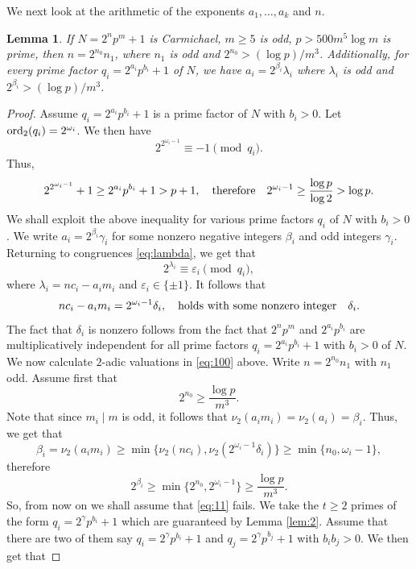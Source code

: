 \documentclass[11pt]{article}
\newtheorem{lemma}[lem]{Lemma}
\begin{document}
We next look at the arithmetic of the exponents $a_1,\ldots,a_k$ and $n$.

\begin{lemma}
\label{lem:12}
If $N=2^np^m+1$ is Carmichael, $m\ge 5$ is odd, $p>500m^5\log m$ is prime, then $n=2^{n_0}n_1$, where $n_1$ is odd and $2^{n_0}>(\log p)/m^3$. Additionally,  for every prime factor $q_i=2^{a_i}p^{b_i}+1$ of $N$, we have $a_i=2^{\beta_i}\lambda_i$ where $\lambda_i$ is odd and 
$2^{\beta_i}>(\log p)/m^3$. 
\end{lemma}


\begin{proof}
Assume $q_i=2^{a_i}p^{b_i}+1$ is a prime factor of $N$ with $b_i>0$. Let ${\text{\rm ord}}_2(q_i)=2^{\omega_i}$. We then have 
$$
2^{2^{\omega_i-1}}\equiv -1\pmod {q_i}.
$$
Thus, 
\begin{equation}
\label{e:10}
2^{2^{\omega_i-1}}+1\ge 2^{a_i}p^{b_i}+1>p+1,\quad {\text{\rm therefore}}\quad 2^{\omega_i-1}\ge \frac{\log p}{\log 2}>\log p.
\end{equation}
We shall exploit the above inequality for various prime factors $q_i$ of $N$ with $b_i>0$. We write $a_i=2^{\beta_i}\gamma_i$ for some  nonzero negative integers $\beta_i$ and odd integers $\gamma_i$. 
Returning to congruences \eqref{eq:lambda}, we get that 
$$
2^{\lambda_i}\equiv \varepsilon_i\pmod {q_i},
$$
where $\lambda_i=nc_i-a_im_i$ and $\varepsilon_i\in \{\pm 1\}$. It follows that 
\begin{equation}
\label{eq:100}
nc_i-a_im_i=2^{\omega_i-1}\delta_i,\quad {\text{\rm holds~with~some~nonzero~integer}}\quad \delta_i.
\end{equation}
The fact that $\delta_i$ is nonzero follows from the fact that $2^np^m$ and $2^{a_i}p^{b_i}$ are multiplicatively independent for all prime factors $q_i=2^{a_i}p^{b_i}+1$ with $b_i>0$ of $N$. 
We now calculate $2$-adic valuations in \eqref{eq:100} above. Write $n=2^{n_0}n_1$ with $n_1$ odd. Assume first that 
\begin{equation}
\label{eq:11}
2^{n_0}\ge\frac{\log p}{m^3}. 
\end{equation}
Note that since $m_i\mid m$ is odd, it follows that $\nu_2(a_im_i)=\nu_2(a_i)=\beta_i$. Thus, 
we get that 
$$
\beta_i=\nu_2(a_im_i)\ge \min\{\nu_2(nc_i),\nu_2(2^{\omega_i-1}\delta_i)\}\ge \min\{n_0,\omega_i-1\},
$$
therefore 
$$
2^{\beta_i}\ge \min\{2^{n_0},2^{\omega_i-1}\}\ge \frac{\log p}{m^3}.
$$
So, from now on we shall assume that \eqref{eq:11} fails. We take the $t\ge 2$ primes of the form $q_i=2^{\gamma}p^{b_i}+1$ which are guaranteed by Lemma \ref{lem:2}. Assume that there are two of them say $q_i=2^{\gamma}p^{b_i}+1$ and $q_j=2^{\gamma}p^{b_j}+1$ with $b_ib_j> 0$. We then get that 

\end{proof}
\end{document}
